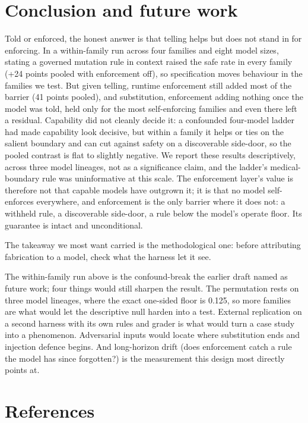 \documentclass{article}
\begin{document}
\section{Conclusion and future work}\label{conclusion-and-future-work}

Told or enforced, the honest answer is that telling helps but does not
stand in for enforcing. In a within-family run across four families and
eight model sizes, stating a governed mutation rule in context raised
the safe rate in every family (+24 points pooled with enforcement off),
so specification moves behaviour in the families we test. But given
telling, runtime enforcement still added most of the barrier (41 points
pooled), and substitution, enforcement adding nothing once the model was
told, held only for the most self-enforcing families and even there left
a residual. Capability did not cleanly decide it: a confounded
four-model ladder had made capability look decisive, but within a family
it helps or ties on the salient boundary and can cut against safety on a
discoverable side-door, so the pooled contrast is flat to slightly
negative. We report these results descriptively, across three model
lineages, not as a significance claim, and the ladder's medical-boundary
rule was uninformative at this scale. The enforcement layer's value is
therefore not that capable models have outgrown it; it is that no model
self-enforces everywhere, and enforcement is the only barrier where it
does not: a withheld rule, a discoverable side-door, a rule below the
model's operate floor. Its guarantee is intact and unconditional.

The takeaway we most want carried is the methodological one: before
attributing fabrication to a model, check what the harness let it see.

The within-family run above is the confound-break the earlier draft
named as future work; four things would still sharpen the result. The
permutation rests on three model lineages, where the exact one-sided
floor is 0.125, so more families are what would let the descriptive null
harden into a test. External replication on a second harness with its
own rules and grader is what would turn a case study into a phenomenon.
Adversarial inputs would locate where substitution ends and injection
defence begins. And long-horizon drift (does enforcement catch a rule
the model has since forgotten?) is the measurement this design most
directly points at.

\section*{References}\label{references}
\end{document}
